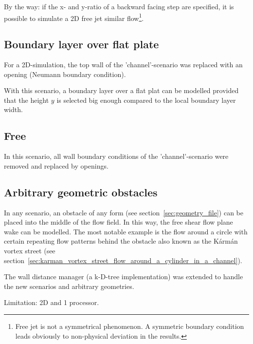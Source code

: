\noii By the way: if the x- and y-ratio of a backward facing step are specified, it is possible to simulate a 2D free jet similar flow\footnote{Free jet is not a symmetrical phenomenon. A symmetric boundary condition leads obviously to non-physical deviation in the results.}.


\subsection*{Boundary layer over flat plate} %
\label{sub:boundary_layer_over_flat_plate}

For a 2D-simulation, the top wall of the 'channel'-scenario was replaced with an opening (Neumann boundary condition).

\noii With this scenario, a boundary layer over a flat plat can be modelled provided that the height $y$ is selected big enough compared to the local boundary layer width.

\subsection*{Free} %
\label{sub:free}

In this scenario, all wall boundary conditions of the 'channel'-scenario were removed and replaced by openings.

\subsection*{Arbitrary geometric obstacles} %
\label{sub:arbitrary_geometric_obstacles}

In any scenario, an obstacle of any form (see section~\ref{sec:geometry_file}) can be placed into the middle of the flow field. In this way, the free shear flow plane wake can be modelled. The most notable example is the flow around a circle with certain repeating flow patterns behind the obstacle also known as the K\'{a}rm\'{a}n vortex street (see section~\ref{sec:karman_vortex_street_flow_around_a_cylinder_in_a_channel}).

\noii The wall distance manager (a k-D-tree implementation) was extended to handle the new scenarios and arbitrary geometries.


\noii Limitation: 2D and 1 processor.


